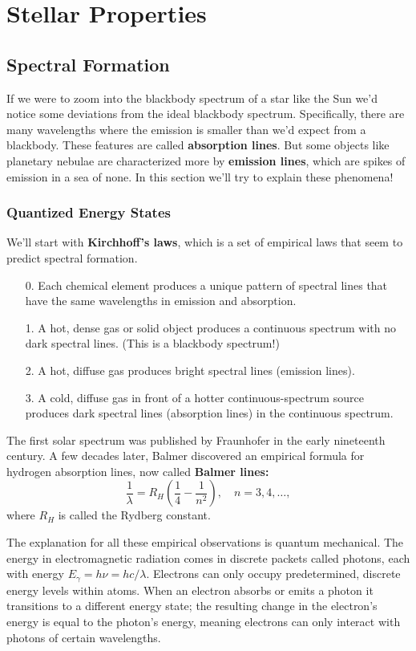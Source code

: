 \documentclass[../a062main.tex]{subfiles}
\begin{document}
\chapter{Stellar Properties}
\section{Spectral Formation}
If we were to zoom into the blackbody spectrum of a star like the Sun we'd notice some deviations from the ideal blackbody spectrum.
Specifically, there are many wavelengths where the emission is smaller than we'd expect from a blackbody.
These features are called \textbf{absorption lines}.
But some objects like planetary nebulae are characterized more by \textbf{emission lines}, which are spikes of emission in a sea of none.
In this section we'll try to explain these phenomena!

\subsection*{Quantized Energy States}
We'll start with \textbf{Kirchhoff's laws}, which is a set of empirical laws that seem to predict spectral formation.
\begin{enumerate}
    \item[0.] Each chemical element produces a unique pattern of spectral lines that have the same wavelengths in emission and absorption.
    \item[1.] A hot, dense gas or solid object produces a continuous spectrum with no dark spectral lines.
    (This is a blackbody spectrum!)
    \item[2.] A hot, diffuse gas produces bright spectral lines (emission lines).
    \item[3.] A cold, diffuse gas in front of a hotter continuous-spectrum source produces dark spectral lines (absorption lines) in the continuous spectrum.
\end{enumerate}
The first solar spectrum was published by Fraunhofer in the early nineteenth century.
A few decades later, Balmer discovered an empirical formula for hydrogen absorption lines, now called \textbf{Balmer lines:}
\[ \frac{1}{\lambda} = R_H \left( \frac{1}{4} - \frac{1}{n^2} \right), \quad n = 3,4, \ldots, \]
where $R_H$ is called the Rydberg constant.

The explanation for all these empirical observations is quantum mechanical.
The energy in electromagnetic radiation comes in discrete packets called photons, each with energy $E_\gamma = h\nu = hc / \lambda$.
Electrons can only occupy predetermined, discrete energy levels within atoms.
When an electron absorbs or emits a photon it transitions to a different energy state; the resulting change in the electron's energy is equal to the photon's energy, meaning electrons can only interact with photons of certain wavelengths.
\end{document}
